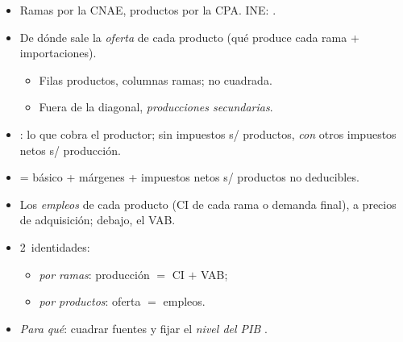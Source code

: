 \documentclass{article}
\begin{document}
\begin{columnas}
\begin{itemize}
\item Ramas por la CNAE, productos por la CPA. INE: .
\end{itemize}
\begin{itemize}
\item De dónde sale la \emph{oferta} de cada producto (qué produce cada rama + importaciones).
  \begin{itemize}
  \item Filas productos, columnas ramas; no cuadrada.
  \item Fuera de la diagonal, \emph{producciones secundarias}.
  \end{itemize}
\item {}: lo que cobra el productor; sin impuestos s/ productos, \emph{con} otros impuestos netos s/ producción.
\item {} = básico + márgenes + impuestos netos s/ productos no deducibles.
\end{itemize}
\begin{itemize}
\item Los \emph{empleos} de cada producto (CI de cada rama o demanda final), a precios de adquisición; debajo, el VAB.
\item 2~identidades:
  \begin{itemize}
  \item \emph{por ramas}: producción $=$ CI $+$ VAB;
  \item \emph{por productos}: oferta $=$ empleos.
  \end{itemize}
\item \emph{Para qué}: cuadrar fuentes y fijar el \emph{nivel del PIB} .
\end{itemize}


\end{columnas}
\end{document}
